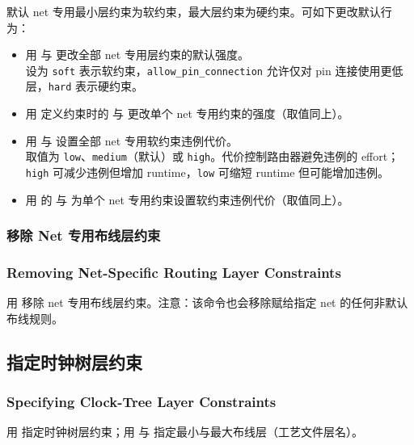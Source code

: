 默认 net 专用最小层约束为软约束，最大层约束为硬约束。可如下更改默认行为：
\begin{itemize}
  \item 用  与  更改全部 net 专用层约束的默认强度。\\
        设为 \texttt{soft} 表示软约束，\texttt{allow\_pin\_connection} 允许仅对 pin 连接使用更低层，\texttt{hard} 表示硬约束。
  \item 用  定义约束时的  与  更改单个 net 专用约束的强度（取值同上）。
  \item 用  与  设置全部 net 专用软约束违例代价。\\
        取值为 \texttt{low}、\texttt{medium}（默认）或 \texttt{high}。代价控制路由器避免违例的 effort；\texttt{high} 可减少违例但增加 runtime，\texttt{low} 可缩短 runtime 但可能增加违例。
  \item 用  的  与  为单个 net 专用约束设置软约束违例代价（取值同上）。
\end{itemize}

\subsubsection{移除 Net 专用布线层约束}
\subsubsection*{Removing Net-Specific Routing Layer Constraints}

用  移除 net 专用布线层约束。注意：该命令也会移除赋给指定 net 的任何非默认布线规则。

\subsection{指定时钟树层约束}
\subsubsection*{Specifying Clock-Tree Layer Constraints}

用  指定时钟树层约束；用  与  指定最小与最大布线层（工艺文件层名）。

